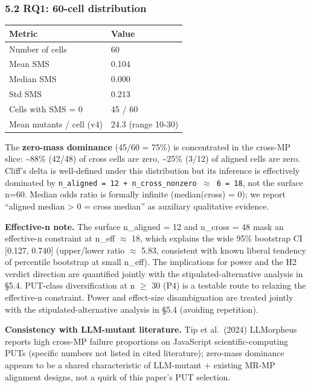 \documentclass[review,12pt,authoryear]{elsarticle}
\newcounter{none}                   %
\begin{document}
\subsubsection{5.2 RQ1: 60-cell
distribution}\label{rq1-60-cell-distribution}

{\def\LTcaptype{none} %
\begin{longtable}[]{@{}ll@{}}
\toprule\noalign{}
Metric & Value \\
\midrule\noalign{}
\endhead
\bottomrule\noalign{}
\endlastfoot
Number of cells & 60 \\
Mean SMS & 0.104 \\
Median SMS & 0.000 \\
Std SMS & 0.213 \\
Cells with SMS = 0 & 45 / 60 \\
Mean mutants / cell (v4) & 24.3 (range 10-30) \\
\end{longtable}
}

The \textbf{zero-mass dominance} (45/60 = 75\%) is concentrated in the
cross-MP slice: \textasciitilde88\% (42/48) of cross cells are zero,
\textasciitilde25\% (3/12) of aligned cells are zero. Cliff's delta is
well-defined under this distribution but its inference is effectively
dominated by
\texttt{n\_aligned\ =\ 12\ +\ n\_cross\_nonzero\ $\approx$\ 6\ =\ 18}, not the
surface n=60. Median odds ratio is formally infinite (median(cross) =
0); we report ``aligned median \textgreater{} 0 = cross median'' as
auxiliary qualitative evidence.

\textbf{Effective-n note.} The surface n\_aligned = 12 and n\_cross = 48
mask an effective-n constraint at n\_eff $\approx$ 18, which explains the wide
95\% bootstrap CI {[}0.127, 0.740{]} (upper/lower ratio $\approx$ 5.83,
consistent with known liberal tendency of percentile bootstrap at small
n\_eff). The implications for power and the H2 verdict direction are
quantified jointly with the stipulated-alternative analysis in §5.4.
PUT-class diversification at n $\geq$ 30 (P4) is a testable route to relaxing
the effective-n constraint. Power and effect-size disambiguation are
treated jointly with the stipulated-alternative analysis in §5.4
(avoiding repetition).

\textbf{Consistency with LLM-mutant literature.} Tip et al.~(2024)
LLMorpheus reports high cross-MP failure proportions on JavaScript
scientific-computing PUTs (specific numbers not listed in cited
literature); zero-mass dominance appears to be a shared characteristic
of LLM-mutant + existing MR-MP alignment designs, not a quirk of this
paper's PUT selection.
\end{document}
